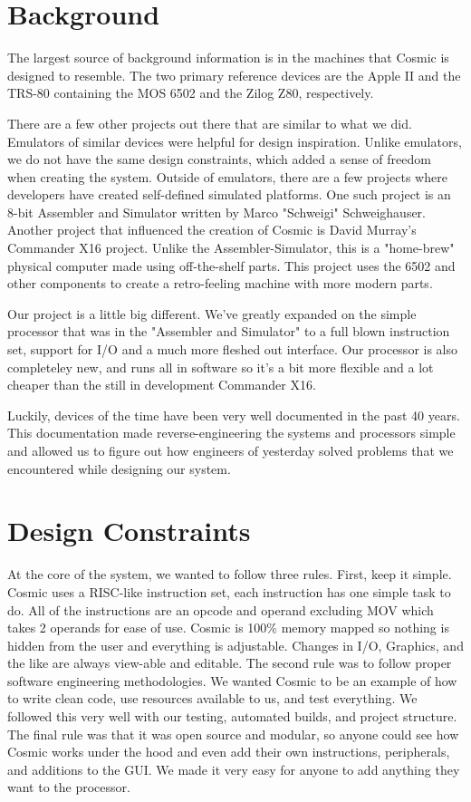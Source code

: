 \documentclass[conference]{IEEEtran}
\begin{document}
\section{Background}
The largest source of background information is in the machines that Cosmic is designed to resemble. The two primary reference devices are the Apple II and the TRS-80 containing the MOS 6502 and the Zilog Z80, respectively.

There are a few other projects out there that are similar to what we did. Emulators of similar devices were helpful for design inspiration. Unlike emulators, we do not have the same design constraints, which added a sense of freedom when creating the system. Outside of emulators, there are a few projects where developers have created self-defined simulated platforms. One such project is an 8-bit Assembler and Simulator written by Marco "Schweigi" Schweighauser\cite{b1}. Another project that influenced the creation of Cosmic is David Murray's Commander X16 project\cite{b2}. Unlike the Assembler-Simulator, this is a "home-brew" physical computer made using off-the-shelf parts. This project uses the 6502 and other components to create a retro-feeling machine with more modern parts. 

Our project is a little big different. We've greatly expanded on the simple processor that was in the "Assembler and Simulator" to a full blown instruction set, support for I/O and a much more fleshed out interface. Our processor is also completeley new, and runs all in software so it's a bit more flexible and a lot cheaper than the still in development Commander X16. 

Luckily, devices of the time have been very well documented in the past 40 years. This documentation made reverse-engineering the systems and processors simple and allowed us to figure out how engineers of yesterday solved problems that we encountered while designing our system. 


\section{Design Constraints}
At the core of the system, we wanted to follow three rules. First, keep it simple. Cosmic uses a RISC-like instruction set, each instruction has one simple task to do. All of the instructions are an opcode and operand excluding MOV which takes 2 operands for ease of use. Cosmic is 100\% memory mapped so nothing is hidden from the user and everything is adjustable. Changes in I/O, Graphics, and the like are always view-able and editable. The second rule was to follow proper software engineering methodologies. We wanted Cosmic to be an example of how to write clean code, use resources available to us, and test everything. We followed this very well with our testing, automated builds, and project structure. The final rule was that it was open source and modular, so anyone could see how Cosmic works under the hood and even add their own instructions, peripherals, and additions to the GUI. We made it very easy for anyone to add anything they want to the processor.
\end{document}
